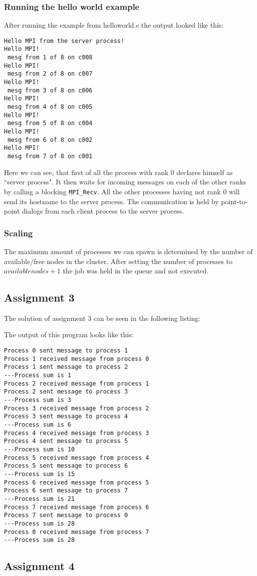 	\subsubsection*{Running the hello world example}
	After running the example from helloworld.c the output looked like this:
\begin{verbatim}
Hello MPI from the server process!
Hello MPI!
 mesg from 1 of 8 on c008
Hello MPI!
 mesg from 2 of 8 on c007
Hello MPI!
 mesg from 3 of 8 on c006
Hello MPI!
 mesg from 4 of 8 on c005
Hello MPI!
 mesg from 5 of 8 on c004
Hello MPI!
 mesg from 6 of 8 on c002
Hello MPI!
 mesg from 7 of 8 on c001
\end{verbatim}
	Here we can see, that first of all the process with rank 0 declares himself as ``server process". It then waits for incoming messages on each of the other ranks by calling a blocking \texttt{MPI\_Recv}. All the other processes having not rank 0 will send its hostname to the server process. The communication is held by point-to-point dialogs from each client process to the server process.
	\subsubsection*{Scaling} 
	The maximum amount of processes we can spawn is determined by the number of available/free nodes in the cluster. After setting the number of processes to $available nodes + 1$ the job was held in the queue and not executed.


	\subsection{Assignment 3}
		The solution of assignment 3 can be seen in the following listing:

		
		The output of this program looks like this:

\begin{verbatim}	
Process 0 sent message to process 1
Process 1 received message from process 0
Process 1 sent message to process 2
---Process sum is 1
Process 2 received message from process 1
Process 2 sent message to process 3
---Process sum is 3
Process 3 received message from process 2
Process 3 sent message to process 4
---Process sum is 6
Process 4 received message from process 3
Process 4 sent message to process 5
---Process sum is 10
Process 5 received message from process 4
Process 5 sent message to process 6
---Process sum is 15
Process 6 received message from process 5
Process 6 sent message to process 7
---Process sum is 21
Process 7 received message from process 6
Process 7 sent message to process 0
---Process sum is 28
Process 0 received message from process 7
---Process sum is 28
\end{verbatim}

	\subsection{Assignment 4}
		



